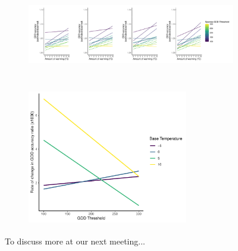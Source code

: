 \documentclass{article}\usepackage[]{graphicx}\usepackage[]{color}
\begin{document}
\begin{figure}
\label{fig:real}
\end{figure}

\begin{figure}
  \begin{subfigure}{\linewidth}
    \caption{}
    \centering
    \includegraphics[height=4cm, width=16cm]{..//analyses/figures/forecasting.pdf}
    \label{fig:forecasting}
    \end{subfigure}
  \begin{subfigure}{\linewidth}
	    \caption{}
      \centering
      \includegraphics[height=6cm, width=7cm]{..//analyses/figures/forecasting_slopes.pdf}
      \label{fig:slopes}
  \end{subfigure}
\caption{To discuss more at our next meeting...}
\label{fig:forecasts}
\end{figure}

  
  
\end{document}
